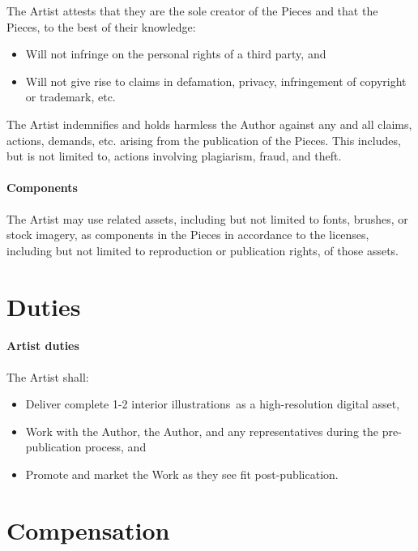 \documentclass[12pt,letterpaper]{article}
\def\ArtType{1-2 interior illustrations}
\begin{document}
The Artist attests that they are the sole creator of the Pieces and that the Pieces, to the best of their knowledge:

\begin{itemize}
    \item Will not infringe on the personal rights of a third party, and
    \item Will not give rise to claims in defamation, privacy, infringement of copyright or trademark, etc.
\end{itemize}

The Artist indemnifies and holds harmless the Author against any and all claims, actions, demands, etc. arising from the publication of the Pieces. This includes, but is not limited to, actions involving plagiarism, fraud, and theft.

\paragraph{Components}

The Artist may use related assets, including but not limited to fonts, brushes, or stock imagery, as components in the Pieces in accordance to the licenses, including but not limited to reproduction or publication rights, of those assets.

\section{Duties}

\paragraph{Artist duties}

The Artist shall:

\begin{itemize}
    \item Deliver complete \ArtType\ as a high-resolution digital asset,
    \item Work with the Author, the Author, and any representatives during the pre-publication process, and
    \item Promote and market the Work as they see fit post-publication.
\end{itemize}

\section{Compensation}
\end{document}
